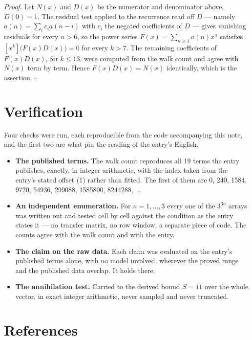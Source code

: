 \documentclass[11pt]{article}
\theoremstyle{definition}
\begin{document}
{\itshape Proof.} Let $N(x)$ and $D(x)$ be the numerator and denominator above, $D(0)=1$. The residual test applied to the recurrence read off $D$ --- namely $a(n) = \sum_i c_i a(n-i)$ with $c_i$ the negated coefficients of $D$ --- gives vanishing residuals for every $n > 6$, so the power series $F(x)=\sum_{n\ge 1}a(n)x^n$ satisfies $[x^k]\bigl(F(x)D(x)\bigr) = 0$ for every $k > 7$. The remaining coefficients of $F(x)D(x)$, for $k \le 13$, were computed from the walk count and agree with $N(x)$ term by term. Hence $F(x)D(x) = N(x)$ identically, which is the assertion. $\square$

\section{Verification}

Four checks were run, each reproducible from the code accompanying this note, and the first two are what pin the reading of the entry's English.

\begin{itemize}

\item {\bfseries The published terms.} The walk count reproduces all 19 terms the entry publishes, exactly, in integer arithmetic, with the index taken from the entry's stated offset (1) rather than fitted. The first of them are 0, 240, 1584, 9720, 54936, 299088, 1585800, 8244288,~\dots

\item {\bfseries An independent enumeration.} For $n = 1,\dots,3$ every one of the $3^{3n}$ arrays was written out and tested cell by cell against the condition as the entry states it --- no transfer matrix, no row window, a separate piece of code. The counts agree with the walk count and with the entry.

\item {\bfseries The claim on the raw data.} Each claim was evaluated on the entry's published terms alone, with no model involved, wherever the proved range and the published data overlap. It holds there.

\item {\bfseries The annihilation test.} Carried to the derived bound $S = 11$ over the whole vector, in exact integer arithmetic, never sampled and never truncated.

\end{itemize}

\section{References}
\end{document}
